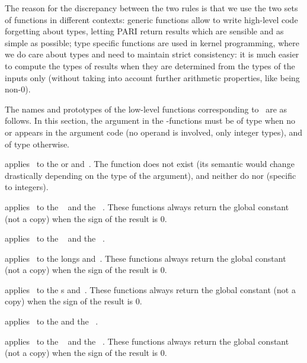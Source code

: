 The reason for the discrepancy between the two rules is that we use the two
sets of functions in different contexts: generic functions allow to write
high-level code forgetting about types, letting PARI return results which are
sensible and as simple as possible; type specific functions are used in
kernel programming, where we do care about types and need to maintain strict
consistency: it is much easier to compute the types of results when they are
determined from the types of the inputs only (without taking into account
further arithmetic properties, like being non-0).
\smallskip

The names and prototypes of the low-level functions corresponding
to \op\ are as follows. In this section, the  argument in the
-functions must be of type  when no  or 
appears in the argument code (no  operand is involved, only integer
types), and of type  otherwise.

 applies \op\ to
the  or   and~. The function
 does not exist (its semantic would change drastically
depending on the type of the  argument), and neither do
 nor  (specific to integers).

 applies \op\ to the
~ and the ~.
 These functions always return the global constant
 (not a copy) when the sign of the result is $0$.

 applies \op\ to the
~ and the ~.

 applies \op\ to the longs
 and~. These functions always return the global constant
 (not a copy) when the sign of the result is $0$.

 applies \op\ to the
s  and~. These functions always return the global
constant  (not a copy) when the sign of the result is $0$.

 applies \op\ to the
  and the ~.

 applies \op\ to the
~ and the ~. These functions always return
the global constant  (not a copy) when the sign of the result
is $0$.

